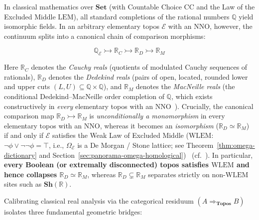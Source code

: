 In classical mathematics over $\mathbf{Set}$ (with Countable Choice $\mathrm{CC}$ and the Law of the Excluded Middle $\mathrm{LEM}$), all standard completions of the rational numbers $\mathbb{Q}$ yield isomorphic fields. In an arbitrary elementary topos $\mathcal{E}$ with an $\mathrm{NNO}$, however, the continuum splits into a canonical chain of comparison morphisms:

\[
  \mathbb{Q}_{\mathcal{E}} \rightarrowtail \mathbb{R}_C \rightarrowtail \mathbb{R}_D \rightarrowtail \mathbb{R}_M
\]

Here $\mathbb{R}_C$ denotes the \emph{Cauchy reals} (quotients of modulated Cauchy sequences of rationals), $\mathbb{R}_D$ denotes the \emph{Dedekind reals} (pairs of open, located, rounded lower and upper cuts $(L, U) \subseteq \mathbb{Q} \times \mathbb{Q}$), and $\mathbb{R}_M$ denotes the \emph{MacNeille reals} (the conditional Dedekind--MacNeille order completion of $\mathbb{Q}$, which exists constructively in \emph{every} elementary topos with an $\mathrm{NNO}$~\cite[\S D4.7, Thm.~D4.7.6]{Johnstone02}). Crucially, the canonical comparison map $\mathbb{R}_D \rightarrowtail \mathbb{R}_M$ is \emph{unconditionally a monomorphism} in every elementary topos with an $\mathrm{NNO}$, whereas it becomes an \emph{isomorphism} ($\mathbb{R}_D \simeq \mathbb{R}_M$) if and only if $\mathcal{E}$ satisfies the Weak Law of Excluded Middle ($\mathrm{WLEM}$: $\neg\phi \vee \neg\neg\phi = \top$, i.e., $\Omega_{\mathcal{E}}$ is a De Morgan / Stone lattice; see Theorem~\ref{thm:omega-dictionary} and Section~\ref{sec:panorama-omega-homological})~\cite[\S D4.7, Thms.~D4.7.4--D4.7.9]{Johnstone02} (cf.~\cite[Ch.~III]{Johnstone82}). In particular, \textbf{every Boolean (or extremally disconnected) topos satisfies $\mathrm{WLEM}$ and hence collapses $\mathbb{R}_D \simeq \mathbb{R}_M$}, whereas $\mathbb{R}_D \subsetneq \mathbb{R}_M$ separates strictly on non-$\mathrm{WLEM}$ sites such as $\mathbf{Sh}(\mathbb{R})$.

Calibrating classical real analysis via the categorical residuum $(A \Rightarrow_{\mathbf{Topos}} B)$ isolates three fundamental geometric bridges:

